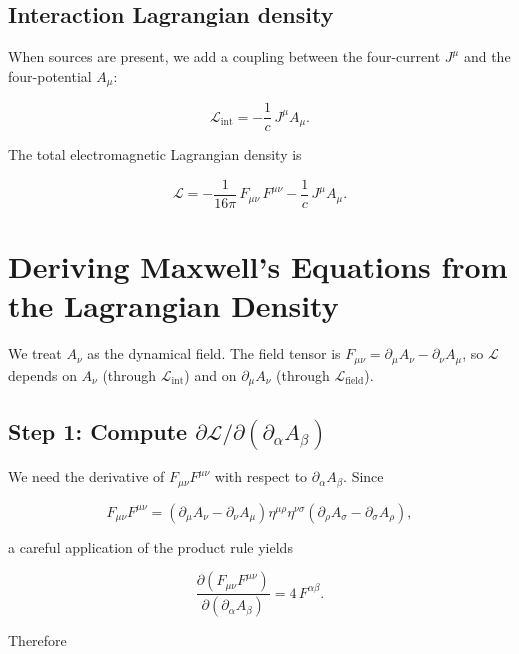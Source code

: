 \subsection*{Interaction Lagrangian density}

When sources are present, we add a coupling between the four-current $J^\mu$ and the four-potential $A_\mu$:

\begin{equation}
\mathcal{L}_{\text{int}} = -\frac{1}{c}\,J^\mu A_\mu.
\end{equation}

The total electromagnetic Lagrangian density is

\begin{equation}
\boxed{\mathcal{L} = -\frac{1}{16\pi}\,F_{\mu\nu}\,F^{\mu\nu} - \frac{1}{c}\,J^\mu A_\mu.}
\end{equation}

\section{Deriving Maxwell's Equations from the Lagrangian Density}

We treat $A_\nu$ as the dynamical field. The field tensor is $F_{\mu\nu} = \partial_\mu A_\nu - \partial_\nu A_\mu$, so $\mathcal{L}$ depends on $A_\nu$ (through $\mathcal{L}_{\text{int}}$) and on $\partial_\mu A_\nu$ (through $\mathcal{L}_{\text{field}}$).

\subsection*{Step 1: Compute $\partial\mathcal{L}/\partial(\partial_\alpha A_\beta)$}

We need the derivative of $F_{\mu\nu}F^{\mu\nu}$ with respect to $\partial_\alpha A_\beta$. Since

\begin{equation}
F_{\mu\nu}F^{\mu\nu} = (\partial_\mu A_\nu - \partial_\nu A_\mu)\eta^{\mu\rho}\eta^{\nu\sigma}(\partial_\rho A_\sigma - \partial_\sigma A_\rho),
\end{equation}

a careful application of the product rule yields

\begin{equation}
\frac{\partial(F_{\mu\nu}F^{\mu\nu})}{\partial(\partial_\alpha A_\beta)} = 4\,F^{\alpha\beta}.
\end{equation}

Therefore

